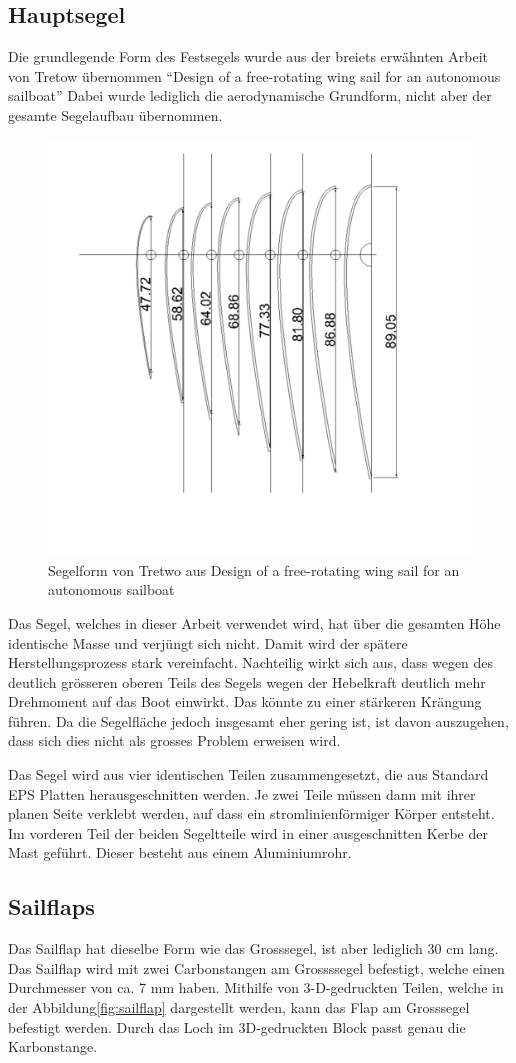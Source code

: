 \subsection{Hauptsegel}
Die grundlegende Form des Festsegels wurde aus der breiets erwähnten Arbeit  von Tretow übernommen \enquote{Design of a free-rotating wing sail for an autonomous sailboat} \cite{Tretow2017DesignOA}
Dabei wurde lediglich die aerodynamische Grundform, nicht aber der gesamte Segelaufbau übernommen.
\begin{figure}[H]
    \centering
    \includegraphics[angle=270,width=0.5\linewidth]{assets/sail_form_foam.png}
    \caption{Segelform von Tretwo aus Design of a free-rotating wing sail for an autonomous sailboat}
    \label{fig:enter-label}
\end{figure}
Das Segel, welches in dieser Arbeit verwendet wird, hat über die gesamten Höhe identische Masse und verjüngt sich nicht. Damit wird der spätere Herstellungsprozess stark vereinfacht. Nachteilig wirkt sich aus, dass wegen des deutlich grösseren oberen Teils des Segels wegen der Hebelkraft deutlich mehr Drehmoment auf das Boot einwirkt. Das könnte zu einer stärkeren Krängung führen. Da die Segelfläche jedoch insgesamt eher gering ist, ist davon auszugehen, dass sich dies nicht als grosses Problem erweisen wird.

Das Segel wird aus vier identischen Teilen zusammengesetzt, die aus Standard EPS Platten herausgeschnitten werden. Je zwei Teile müssen dann mit ihrer planen Seite verklebt werden, auf dass ein stromlinienförmiger Körper entsteht. Im vorderen Teil der beiden Segeltteile wird in einer ausgeschnitten Kerbe der Mast geführt. Dieser besteht aus einem Aluminiumrohr.
\subsection{Sailflaps}
Das Sailflap hat dieselbe Form wie das Grosssegel, ist aber lediglich 30 cm lang. Das Sailflap wird mit zwei Carbonstangen am Grossssegel befestigt, welche einen Durchmesser von ca. 7 mm haben. Mithilfe von 3-D-gedruckten Teilen, welche in der Abbildung\ref{fig:sailflap} dargestellt werden, kann das Flap am Grosssegel befestigt werden. Durch das Loch im 3D-gedruckten Block passt genau die Karbonstange.

